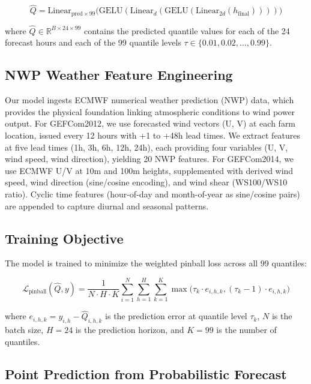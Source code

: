 \documentclass[review]{elsarticle}
\begin{document}
\begin{equation}
\hat{Q} = \text{Linear}_{\text{pred} \times 99}\big(\text{GELU}(\text{Linear}_{d}(\text{GELU}(\text{Linear}_{2d}(h_{\text{final}}))))\big)
\end{equation}

where $\hat{Q} \in \mathbb{R}^{B \times 24 \times 99}$ contains the predicted quantile values for each of the 24 forecast hours and each of the 99 quantile levels $\tau \in \{0.01, 0.02, \ldots, 0.99\}$.

\subsection{NWP Weather Feature Engineering}

Our model ingests ECMWF numerical weather prediction (NWP) data, which provides the physical foundation linking atmospheric conditions to wind power output. For GEFCom2012, we use forecasted wind vectors (U, V) at each farm location, issued every 12 hours with +1 to +48h lead times. We extract features at five lead times (1h, 3h, 6h, 12h, 24h), each providing four variables (U, V, wind speed, wind direction), yielding 20 NWP features. For GEFCom2014, we use ECMWF U/V at 10m and 100m heights, supplemented with derived wind speed, wind direction (sine/cosine encoding), and wind shear (WS100/WS10 ratio). Cyclic time features (hour-of-day and month-of-year as sine/cosine pairs) are appended to capture diurnal and seasonal patterns.

\subsection{Training Objective}

The model is trained to minimize the weighted pinball loss across all 99 quantiles:

\begin{equation}
\mathcal{L}_{\text{pinball}}(\hat{Q}, y) = \frac{1}{N \cdot H \cdot K} \sum_{i=1}^{N}\sum_{h=1}^{H}\sum_{k=1}^{K} \max\big(\tau_k \cdot e_{i,h,k}, (\tau_k - 1) \cdot e_{i,h,k}\big)
\end{equation}

where $e_{i,h,k} = y_{i,h} - \hat{Q}_{i,h,k}$ is the prediction error at quantile level $\tau_k$, $N$ is the batch size, $H=24$ is the prediction horizon, and $K=99$ is the number of quantiles.

\subsection{Point Prediction from Probabilistic Forecast}
\end{document}
